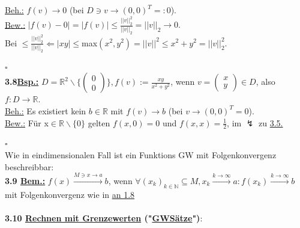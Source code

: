 \documentclass[]{scrartcl}
\begin{document}
	\underline{Beh.:} $f(v)\rightarrow0$ (bei $D \ni v \rightarrow(0,0)^T=:0$).\\
	\underline{Bew.:} $|f(v)-0| = |f(v)| \leq \frac{||v||^2_2}{||v||_2}= ||v||_2\rightarrow0.$\\
	Bei  $\leq \frac{||v||^2_2}{||v||_2} \Leftarrow |xy|\leq $max$(x^2,y^2)=||v||^2\leq x^2+y^2=||v||^2_2$.\\
	\strut\hfill$\square$\\
	\textbf{3.8\underline{Bsp.:}} $D = \mathbb{R}^2 
	\backslash\{\begin{pmatrix}0\\0\end{pmatrix}\}, 
	f(v):=\frac{xy}{x^2+y^2}$, wenn $v=\begin{pmatrix}x\\y\end{pmatrix} 
	\in D$, also $f:D\rightarrow\mathbb{R}$.\\
	\underline{Beh.:} Es existiert kein $b\in \mathbb{R}$ mit $f(v)\rightarrow
	b$ (bei $v\rightarrow (0,0)^T=0$).\\
	\underline{Bew.:} Für x$\in \mathbb{R}\backslash\{0\}$ gelten $f(x,0)=0$ 
	und $f(x,x)=\frac{1}{2}$, im $\lightning$ zu  \ul{3.5.}\\
	\strut\hfill$\square$\\
	Wie in eindimensionalen Fall ist ein Funktions GW mit Folgenkonvergenz 
	beschreibbar:\\
	\textbf{3.9 \underline{Bem.:}}  $f(x) \xrightarrow{M\ni x\rightarrow a}b$, 
	wenn $\forall (x_k)_{k\in \mathbb{N}} \subseteq M, x_k 
	\xrightarrow{k\rightarrow \infty}a: f(x_k)\xrightarrow{k\rightarrow 
	\infty}b$ mit Folgenkonvergenz wie in \ul{an 1.8}\\
	\\
	\textbf{3.10 \underline{Rechnen mit Grenzewerten} 
	("\ul{GWSätze}")}:\\
\end{document}
